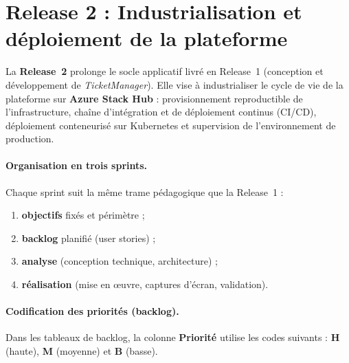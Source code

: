 %
%
%   
%
%

\section*{Release 2 : Industrialisation et déploiement de la plateforme}

La \textbf{Release~2} prolonge le socle applicatif livré en Release~1 (conception et
développement de \textit{TicketManager}). Elle vise à industrialiser le cycle de vie de la
plateforme sur \textbf{Azure Stack Hub} : provisionnement reproductible de l'infrastructure,
chaîne d'intégration et de déploiement continus (CI/CD), déploiement conteneurisé sur
Kubernetes et supervision de l'environnement de production.

\paragraph{Organisation en trois sprints.}
Chaque sprint suit la même trame pédagogique que la Release~1 :
\begin{enumerate}
  \item \textbf{objectifs} fixés et périmètre ;
  \item \textbf{backlog} planifié (user stories) ;
  \item \textbf{analyse} (conception technique, architecture) ;
  \item \textbf{réalisation} (mise en œuvre, captures d'écran, validation).
\end{enumerate}

\paragraph{Codification des priorités (backlog).}
Dans les tableaux de backlog, la colonne \textbf{Priorité} utilise les codes suivants :
\textbf{H} (haute), \textbf{M} (moyenne) et \textbf{B} (basse).

